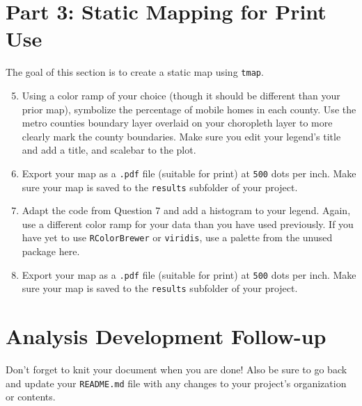 \documentclass{tufte-handout}
\begin{document}
\section{Part 3: Static Mapping for Print Use}
The goal of this section is to create a static map using \texttt{tmap}. 
\begin{enumerate}
\setcounter{enumi}{4}
\item Using a color ramp of your choice (though it should be different than your prior map), symbolize the percentage of mobile homes in each county. Use the metro counties boundary layer overlaid on your choropleth layer to more clearly mark the county boundaries. Make sure you edit your legend's title and add a title, and scalebar to the plot.
\item Export your map as a \texttt{.pdf} file (suitable for print) at \texttt{500} dots per inch. Make sure your map is saved to the \texttt{results} subfolder of your project.
\item Adapt the code from Question 7 and add a histogram to your legend. Again, use a different color ramp for your data than you have used previously. If you have yet to use \texttt{RColorBrewer} or \texttt{viridis}, use a palette from the unused package here.
\item Export your map as a \texttt{.pdf} file (suitable for print) at \texttt{500} dots per inch. Make sure your map is saved to the \texttt{results} subfolder of your project.
\end{enumerate}

\vspace{5mm}
\section{Analysis Development Follow-up}
Don't forget to knit your document when you are done! Also be sure to go back and update your \texttt{README.md} file with any changes to your project's organization or contents.


\end{document}
